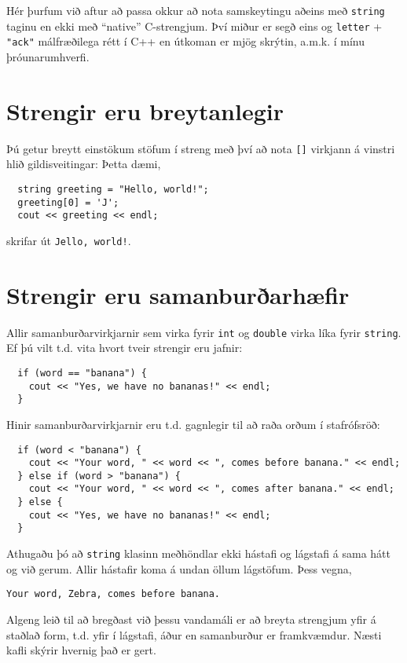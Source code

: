 Hér þurfum við aftur að passa okkur að nota samskeytingu aðeins með {\tt string} taginu en ekki með ``native'' C-strengjum.
Því miður er segð eins og {\tt letter} + \verb+"ack"+ málfræðilega rétt í C++ en útkoman er mjög skrýtin, a.m.k. í mínu þróunarumhverfi.

\section{Strengir eru breytanlegir}

Þú getur breytt einstökum stöfum í streng með því að nota {\tt []} virkjann á vinstri hlið gildisveitingar:
Þetta dæmi,

\begin{verbatim}
  string greeting = "Hello, world!";
  greeting[0] = 'J';
  cout << greeting << endl;
\end{verbatim}
%
skrifar út {\tt Jello, world!}.


\section{Strengir eru samanburðarhæfir}
\label{incomparable}

Allir samanburðarvirkjarnir sem virka fyrir {\tt int} og {\tt double} virka líka fyrir {\tt string}.
Ef þú vilt t.d. vita hvort tveir strengir eru jafnir:

\begin{verbatim}
  if (word == "banana") {
    cout << "Yes, we have no bananas!" << endl;
  }
\end{verbatim}
%
Hinir samanburðarvirkjarnir eru t.d. gagnlegir til að raða orðum í stafrófsröð:

\begin{verbatim}
  if (word < "banana") {
    cout << "Your word, " << word << ", comes before banana." << endl;
  } else if (word > "banana") {
    cout << "Your word, " << word << ", comes after banana." << endl;
  } else {
    cout << "Yes, we have no bananas!" << endl;
  }
\end{verbatim}
%
Athugaðu þó að {\tt string} klasinn meðhöndlar ekki hástafi og lágstafi á sama hátt og við gerum.
Allir hástafir koma á undan öllum lágstöfum.
Þess vegna,
\begin{verbatim}
Your word, Zebra, comes before banana.
\end{verbatim}
%
Algeng leið til að bregðast við þessu vandamáli er að breyta strengjum yfir á staðlað form, t.d. yfir í lágstafi, áður en samanburður er framkvæmdur.
Næsti kafli skýrir hvernig það er gert.

